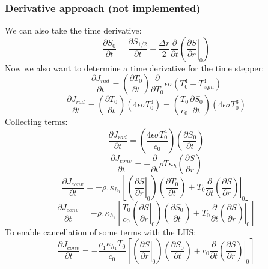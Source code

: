 \subsubsection{Derivative approach (not implemented)}
We can also take the time derivative:
\begin{equation}
\frac{\partial S_0}{\partial t} = \frac{\partial S_{1/2}}{\partial t} - \frac{\Delta r}{2} \frac{\partial}{\partial t} \left( \left. \frac{\partial S}{\partial r}\right|_0 \right)
\end{equation}
Now we also want to determine a time derivative for the time stepper:
\begin{equation}
\frac{\partial J_{rad}}{\partial t} = \left(\frac{\partial T_0}{\partial t}\right) \frac{\partial}{\partial T_0} \epsilon \sigma (T_0^4 - T_{eqm}^4)
\end{equation}
\begin{equation}
\frac{\partial J_{rad}}{\partial t} = \left(\frac{\partial T_0}{\partial t}\right) \left(4 \epsilon \sigma T_0^3\right) = \left( \frac{T_0}{c_0} \frac{\partial S_0}{\partial t} \right) (4 \epsilon \sigma T_0^3)
\end{equation}
Collecting terms:
\begin{equation}
\frac{\partial J_{rad}}{\partial t} = \left( \frac{4 \epsilon \sigma T_0^4}{c_0} \right) \left(\frac{\partial S_0}{\partial t} \right)
\end{equation}
\begin{equation}
\frac{\partial J_{conv}}{\partial t} = - \frac{\partial}{\partial t} \rho T \kappa_h \left( \frac{\partial S}{\partial r} \right)
\end{equation}
\begin{equation}
\frac{\partial J_{conv}}{\partial t} = - \rho_1 \kappa_{h_1} \left[ \left(\left.\frac{\partial S}{\partial r}\right|_0 \right) \left( \frac{\partial T_0}{\partial t} \right) + T_0 \frac{\partial}{\partial t} \left. \left(\frac{\partial S}{\partial r}\right) \right|_0  \right]
\end{equation}
\begin{equation}
\frac{\partial J_{conv}}{\partial t} = - \rho_1 \kappa_{h_1} \left[ \frac{T_0}{c_0} \left(\left.\frac{\partial S}{\partial r}\right|_0 \right) \left( \frac{\partial S_0}{\partial t} \right) + T_0 \frac{\partial}{\partial t} \left. \left(\frac{\partial S}{\partial r}\right) \right|_0  \right]
\end{equation}
To enable cancellation of some terms with the LHS:
\begin{equation}
\frac{\partial J_{conv}}{\partial t} = - \frac{\rho_1 \kappa_{h_1} T_0}{c_0} \left[ \left(\left.\frac{\partial S}{\partial r}\right|_0 \right) \left( \frac{\partial S_0}{\partial t} \right) + c_0 \frac{\partial}{\partial t} \left. \left(\frac{\partial S}{\partial r}\right) \right|_0  \right]
\end{equation}

